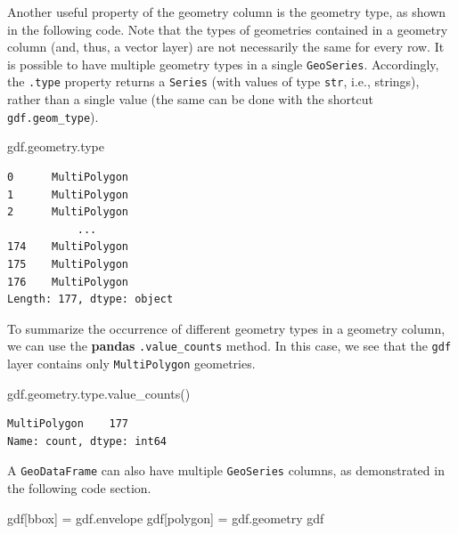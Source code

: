 \documentclass[
  letterpaper,
]{krantz}
\newenvironment{Shaded}{\begin{snugshade}}{\end{snugshade}}
\newcommand{\BuiltInTok}[1]{\textcolor[rgb]{0.00,0.23,0.31}{#1}}
\newcommand{\NormalTok}[1]{\textcolor[rgb]{0.00,0.23,0.31}{#1}}
\newcommand{\OperatorTok}[1]{\textcolor[rgb]{0.37,0.37,0.37}{#1}}
\newcommand{\StringTok}[1]{\textcolor[rgb]{0.13,0.47,0.30}{#1}}
\begin{document}
Another useful property of the geometry column is the geometry type, as
shown in the following code. Note that the types of geometries contained
in a geometry column (and, thus, a vector layer) are not necessarily the
same for every row. It is possible to have multiple geometry types in a
single \texttt{GeoSeries}. Accordingly, the \texttt{.type} property
returns a \texttt{Series} (with values of type \texttt{str}, i.e.,
strings), rather than a single value (the same can be done with the
shortcut \texttt{gdf.geom\_type}).

\begin{Shaded}
\begin{Highlighting}[]
\NormalTok{gdf.geometry.}\BuiltInTok{type}
\end{Highlighting}
\end{Shaded}

\begin{verbatim}
0      MultiPolygon
1      MultiPolygon
2      MultiPolygon
           ...     
174    MultiPolygon
175    MultiPolygon
176    MultiPolygon
Length: 177, dtype: object
\end{verbatim}

To summarize the occurrence of different geometry types in a geometry
column, we can use the \textbf{pandas} \texttt{.value\_counts} method.
In this case, we see that the \texttt{gdf} layer contains only
\texttt{\textquotesingle{}MultiPolygon\textquotesingle{}} geometries.

\begin{Shaded}
\begin{Highlighting}[]
\NormalTok{gdf.geometry.}\BuiltInTok{type}\NormalTok{.value\_counts()}
\end{Highlighting}
\end{Shaded}

\begin{verbatim}
MultiPolygon    177
Name: count, dtype: int64
\end{verbatim}

A \texttt{GeoDataFrame} can also have multiple \texttt{GeoSeries}
columns, as demonstrated in the following code section.

\begin{Shaded}
\begin{Highlighting}[]
\NormalTok{gdf[}\StringTok{\textquotesingle{}bbox\textquotesingle{}}\NormalTok{] }\OperatorTok{=}\NormalTok{ gdf.envelope}
\NormalTok{gdf[}\StringTok{\textquotesingle{}polygon\textquotesingle{}}\NormalTok{] }\OperatorTok{=}\NormalTok{ gdf.geometry}
\NormalTok{gdf}
\end{Highlighting}
\end{Shaded}
\end{document}
